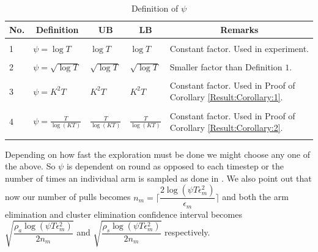 \begin{table}
\caption{Definition of $\psi$}
\label{App:D:table:1}
\begin{center}
\begin{tabular}{p{1.5cm}p{3.5cm}p{1.5cm}p{1.5cm}p{4.5cm}}
\multicolumn{1}{c}{\bf No.} &\multicolumn{1}{c}{\bf Definition}  &\multicolumn{1}{c}{\bf UB} &\multicolumn{1}{c}{\bf LB} &\multicolumn{1}{c}{\bf Remarks} \\
\hline \\
1	&$\psi=\log{T}$         & $\log{T}$  &$\log{T}$ & Constant factor. Used in experiment. \\ 
\hline \\
2	&$\psi=\sqrt{\log T}$         & $\sqrt{\log T}$  &$\sqrt{\log T}$ & Smaller factor than Definition $1$.  \\  
\hline \\
3	&$\psi=K^{2}T$         & $K^{2}T$  &$ K^{2}T$ & Constant factor. Used in Proof of Corollary \ref{Result:Corollary:1}. \\ 
\hline \\ 
4	&$\psi=\frac{T}{\log (KT)}$         & $\frac{T}{\log (KT)}$  &$\frac{T}{\log (KT)}$ & Constant factor. Used in Proof of Corollary \ref{Result:Corollary:2}. \\ 
\hline \\
\end{tabular}
\end{center}	
\end{table}
	
 Depending on how fast the exploration must be done we might choose any one of the above. So $\psi$ is dependent on round as opposed to each timestep or the number of times an individual arm is sampled as done in \cite{liu2016modification}. We also point out that now our number of pulls becomes $n_{m}=\bigg\lceil\dfrac{2\log{(\psi T\epsilon_{m}^{2})}}{\epsilon_{m}}\bigg\rceil$ and both the arm elimination and cluster elimination confidence interval becomes $\sqrt{\dfrac{\rho_{a}\log{(\psi T\epsilon_{m}^{2})}}{2 n_{m}}}$ and $\sqrt{\dfrac{\rho_{s} \log{(\psi T\epsilon_{m}^{2})}}{2 n_{m}}}$  respectively.
	
